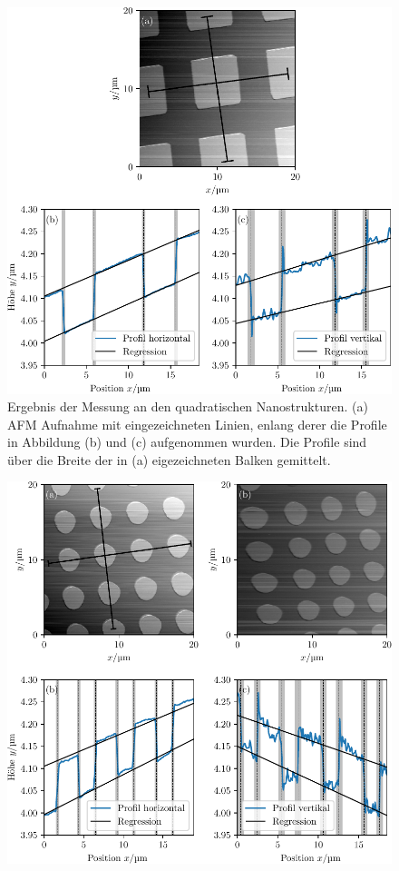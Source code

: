 \begin{figure}
  \centering
  \includegraphics[scale = 1]{../analysis/data/nanostruktur_quadrate/quadrate_profile.pdf}
  \caption{Ergebnis der Messung an den quadratischen Nanostrukturen. (a) AFM Aufnahme mit eingezeichneten
  Linien, enlang derer die Profile in Abbildung (b) und (c) aufgenommen wurden. Die Profile sind
  über die Breite der in (a) eigezeichneten Balken gemittelt.}
  \label{fig: quadrate_profil}
\end{figure}



\begin{figure}
  \centering
  \includegraphics[scale = 1]{../analysis/data/nanostruktur_kreise/kreise_profile.pdf}
  \caption{}
  \label{fig: kreise_profil}
\end{figure}
